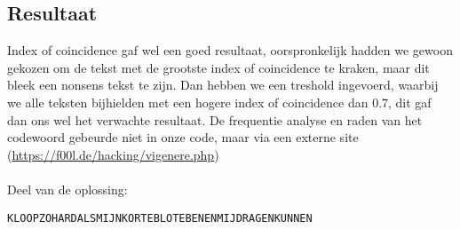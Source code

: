 \documentclass{article}
\begin{document}
\subsection{Resultaat}
Index of coincidence gaf wel een goed resultaat, oorspronkelijk hadden we gewoon gekozen om de tekst met de grootste index of coincidence te kraken, maar dit bleek een nonsens tekst te zijn. Dan hebben we een treshold ingevoerd, waarbij we alle teksten bijhielden met een hogere index of coincidence dan 0.7, dit gaf dan ons wel het verwachte resultaat. De frequentie analyse en raden van het codewoord gebeurde niet in onze code, maar via een externe site (\url{https://f00l.de/hacking/vigenere.php}) \\\\
Deel van de oplossing: 
\begin{verbatim}
KLOOPZOHARDALSMIJNKORTEBLOTEBENENMIJDRAGENKUNNEN
\end{verbatim}
\end{document}
